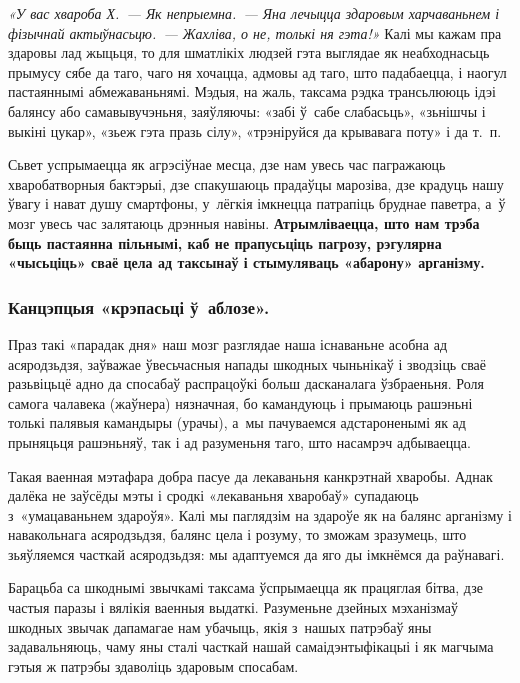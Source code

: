 \emph{«У вас хвароба Х.~--- Як непрыемна.~--- Яна лечыцца здаровым харчаваньнем і фізычнай актыўнасьцю.~--- Жахліва, о не, толькі ня гэта!»} Калі мы кажам пра здаровы лад жыцьця, то для шматлікіх людзей гэта выглядае як неабходнасьць прымусу сябе да таго, чаго ня хочацца, адмовы ад таго, што падабаецца, і наогул пастаяннымі абмежаваньнямі. Мэдыя, на жаль, таксама рэдка трансьлююць ідэі балянсу або самавывучэньня, заяўляючы: «забі ў~сабе слабасьць», «зьнішчы і выкіні цукар», «зьеж гэта празь сілу», «трэніруйся да крывавага поту» і да т.~п.

Сьвет успрымаецца як агрэсіўнае месца, дзе нам увесь час пагражаюць хваробатворныя бактэрыі, дзе спакушаюць прадаўцы марозіва, дзе крадуць нашу ўвагу і нават душу смартфоны, у~лёгкія імкнецца патрапіць бруднае паветра, а~ў мозг увесь час залятаюць дрэнныя навіны. \textbf{Атрымліваецца, што нам трэба быць пастаянна пільнымі, каб не прапусьціць пагрозу, рэгулярна «чысьціць» сваё цела ад таксынаў і стымуляваць «абарону» арганізму.}

\subsubsection{Канцэпцыя «крэпасьці ў~аблозе».} 

Праз такі «парадак дня» наш мозг разглядае наша існаваньне асобна ад асяродзьдзя, заўважае ўвесьчасныя напады шкодных чыньнікаў і зводзіць сваё разьвіцьцё адно да спосабаў распрацоўкі больш дасканалага ўзбраеньня. Роля самога чалавека (жаўнера) нязначная, бо камандуюць і прымаюць рашэньні толькі палявыя камандыры (урачы), а~мы пачуваемся адстароненымі як ад прыняцьця рашэньняў, так і ад разуменьня таго, што насамрэч адбываецца. 


Такая ваенная мэтафара добра пасуе да лекаваньня канкрэтнай хваробы. Аднак далёка не заўсёды мэты і сродкі «лекаваньня хваробаў» супадаюць з~«умацаваньнем здароўя». Калі мы паглядзім на здароўе як на балянс арганізму і навакольнага асяродзьдзя, балянс цела і розуму, то зможам зразумець, што зьяўляемся часткай асяродзьдзя: мы адаптуемся да яго ды імкнёмся да раўнавагі.

Барацьба са шкоднымі звычкамі таксама ўспрымаецца як працяглая бітва, дзе частыя паразы і вялікія ваенныя выдаткі. Разуменьне дзейных мэханізмаў шкодных звычак дапамагае нам убачыць, якія з~нашых патрэбаў яны задавальняюць, чаму яны сталі часткай нашай самаідэнтыфікацыі і як магчыма гэтыя ж патрэбы здаволіць здаровым спосабам.

